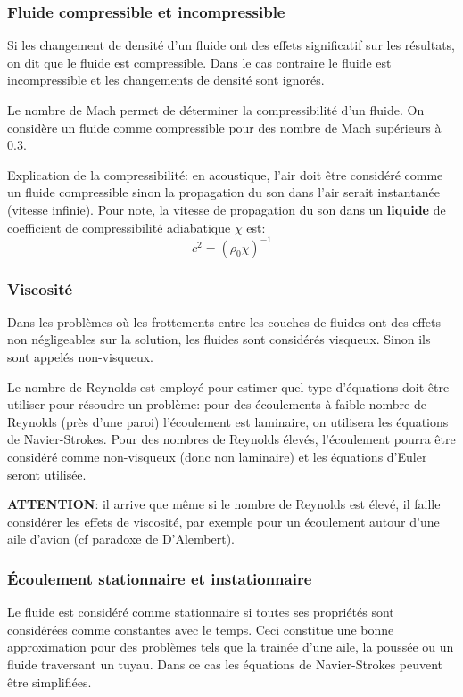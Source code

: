 \documentclass[10pt,a4paper]{article}
\begin{document}
\subsubsection{Fluide compressible et incompressible}
Si les changement de densité d'un fluide ont des effets significatif sur les résultats, on dit que le fluide est compressible. Dans le cas contraire le fluide est incompressible et les changements de densité sont ignorés.

Le nombre de Mach\cite{nbmach} permet de déterminer la compressibilité d'un fluide. On considère un fluide comme compressible pour des nombre de Mach supérieurs à $0.3$.

Explication de la compressibilité: en acoustique, l'air doit être considéré comme un fluide compressible sinon la propagation du son dans l'air serait instantanée (vitesse infinie). Pour note, la vitesse de propagation du son\cite{vitesseson} dans un \textbf{liquide} de coefficient de compressibilité adiabatique $\chi$ est:
\begin{equation}
c^{2} = (\rho_{0}\chi)^{-1}
\end{equation}

\subsubsection{Viscosité}
Dans les problèmes où les frottements entre les couches de fluides ont des effets non négligeables sur la solution, les fluides sont considérés visqueux. Sinon ils sont appelés non-visqueux. 

Le nombre de Reynolds\cite{nbreynolds} est employé pour estimer quel type d'équations doit être utiliser pour résoudre un problème: pour des écoulements à faible nombre de Reynolds (près d'une paroi) l'écoulement est laminaire, on utilisera les équations de Navier-Strokes. Pour des nombres de Reynolds élevés, l'écoulement pourra être considéré comme non-visqueux (donc non laminaire) et les équations d'Euler seront utilisée.

\textbf{ATTENTION}: il arrive que même si le nombre de Reynolds est élevé, il faille considérer les effets de viscosité, par exemple pour un écoulement autour d'une aile d'avion (cf paradoxe de D'Alembert\cite{paradoxealembert}).

\subsubsection{Écoulement stationnaire et instationnaire}
Le fluide est considéré comme stationnaire si toutes ses propriétés sont considérées comme constantes avec le temps. Ceci constitue une bonne approximation pour des problèmes tels que la trainée d'une aile, la poussée ou un fluide traversant un tuyau. Dans ce cas les équations de Navier-Strokes peuvent être simplifiées.
\end{document}
